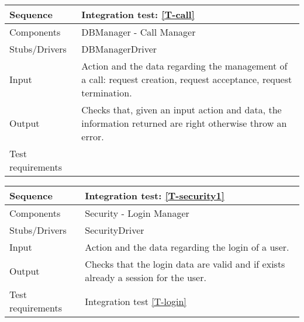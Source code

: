 \begin{table}[H]
    \begin{tabularx}{\textwidth}{l|X}
        \hline
        Sequence
        & 
        Integration test: \ref{T-call}
        \\ \hline
        Components 
        & 
        DBManager - Call Manager
        \\ \hline
        Stubs/Drivers 
        & 
        DBManagerDriver
        \\ \hline
        Input 
        & 
        Action and the data regarding the management of a call: request creation, request acceptance, request termination.
        \\ \hline
        Output 
        & 
        Checks that, given an input action and data, the information returned are right otherwise throw an error.
        \\ \hline
        Test requirements 
        & 
        
        \\ \hline
    \end{tabularx}
\end{table}

\begin{table}[H]
    \begin{tabularx}{\textwidth}{l|X}
        \hline
        Sequence
        & 
        Integration test: \ref{T-security1}
        \\ \hline
        Components 
        & 
        Security - Login Manager
        \\ \hline
        Stubs/Drivers 
        & 
        SecurityDriver
        \\ \hline
        Input 
        & 
        Action and the data regarding the login of a user.
        \\ \hline
        Output 
        & 
        Checks that the login data are valid and if exists already a session for the user.
        \\ \hline
        Test requirements 
        & 
        Integration test \ref{T-login}
        \\ \hline
    \end{tabularx}
\end{table}

